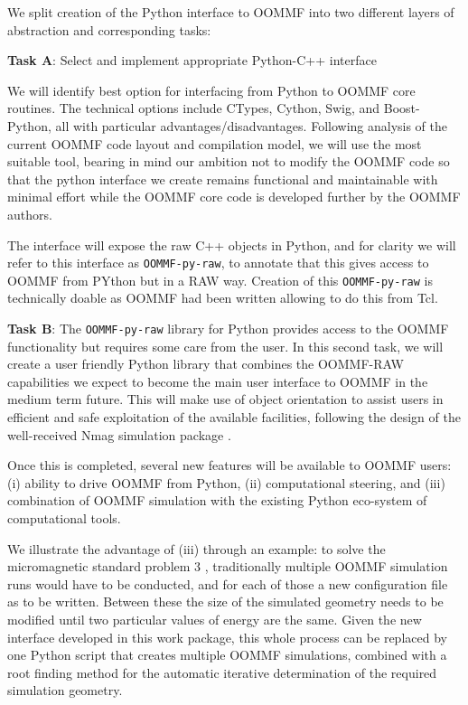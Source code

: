 \begin{workpackage}
\begin{tasklist}
\begin{task}[id=oommf-python-interface,title=OOMMF case study: Create Python interface to OOMMF code]
  We split creation of the Python interface to OOMMF into two
  different layers of abstraction and corresponding tasks:

  \textbf{Task A}: Select and implement appropriate Python-C++ interface

  We will identify best option for interfacing from Python to OOMMF
  core routines. The technical options include CTypes, Cython, Swig,
  and Boost-Python, all with particular
  advantages/disadvantages. Following analysis of the current OOMMF
  code layout and compilation model, we will use the most suitable
  tool, bearing in mind our ambition not to modify the OOMMF code so
  that the python interface we create remains functional and
  maintainable with minimal effort while the OOMMF core code is
  developed further by the OOMMF authors.

  The interface will expose the raw C++ objects in Python, and for
  clarity we will refer to this interface as \texttt{OOMMF-py-raw}, to
  annotate that this gives access to OOMMF from PYthon but in a RAW
  way. Creation of this \texttt{OOMMF-py-raw} is technically doable as
  OOMMF had been written allowing to do this from Tcl.

  \textbf{Task B}: The \texttt{OOMMF-py-raw} library for Python
  provides access to the OOMMF functionality but requires some care
  from the user. In this second task, we will create a user friendly
  Python library that combines the OOMMF-RAW capabilities we expect to
  become the main user interface to OOMMF in the medium term
  future. This will make use of object orientation to assist users in
  efficient and safe exploitation of the available facilities,
  following the design of the well-received Nmag simulation package
  \cite{Nmag-url}.


  Once this is completed, several new features will be available to
  OOMMF users: (i) ability to drive OOMMF from Python, (ii)
  computational steering, and (iii) combination of OOMMF simulation
  with the existing Python eco-system of computational tools.


  We illustrate the advantage of (iii) through an example: to solve
  the micromagnetic standard problem 3
  \cite{Micromagnetic-Standardproblem-3}, traditionally multiple OOMMF
  simulation runs would have to be conducted, and for each of those a
  new configuration file as to be written. Between these the size of
  the simulated geometry needs to be modified until two particular
  values of energy are the same. Given the new interface developed in
  this work package, this whole process can be replaced by one Python
  script that creates multiple OOMMF simulations, combined with a root
  finding method for the automatic iterative determination of the
  required simulation geometry.


\end{task}
\end{tasklist}
\end{workpackage}
